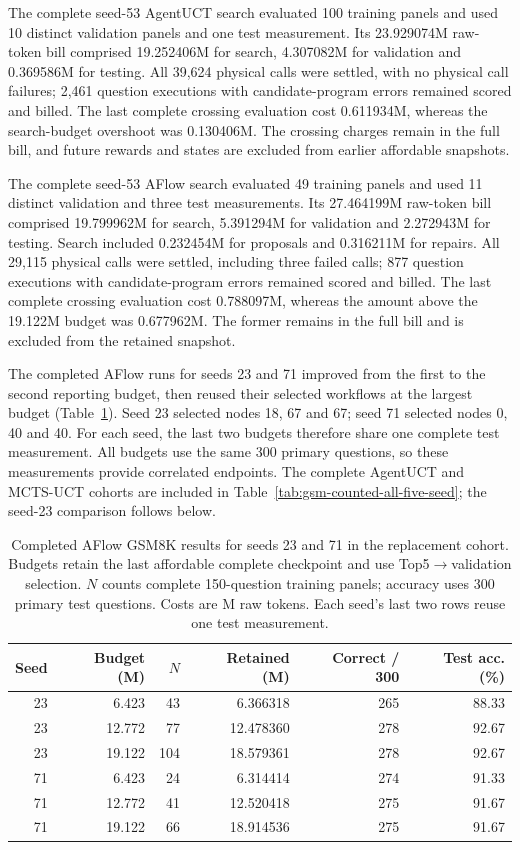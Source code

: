 The complete seed-53 AgentUCT search evaluated 100 training panels and used
10 distinct validation panels and one test measurement. Its 23.929074M
raw-token bill comprised 19.252406M for search, 4.307082M for validation
and 0.369586M for testing. All 39,624 physical calls were settled, with no
physical call failures; 2,461 question executions with candidate-program
errors remained scored and billed. The last complete crossing evaluation
cost 0.611934M, whereas the search-budget overshoot was 0.130406M.
The crossing charges remain in the full bill, and future rewards and states
are excluded from earlier affordable snapshots.

The complete seed-53 AFlow search evaluated 49 training panels and used
11 distinct validation and three test measurements. Its 27.464199M raw-token
bill comprised 19.799962M for search, 5.391294M for validation and 2.272943M
for testing. Search included 0.232454M for proposals and 0.316211M for
repairs. All 29,115 physical calls were settled, including three failed
calls; 877 question executions with candidate-program errors remained
scored and billed. The last complete crossing evaluation cost 0.788097M,
whereas the amount above the 19.122M budget was 0.677962M. The former
remains in the full bill and is excluded from the retained snapshot.

The completed AFlow runs for seeds 23 and 71 improved from the first
to the second reporting budget, then reused their selected workflows at
the largest budget (Table~\ref{tab:gsm-counted-aflow-seeds23-71}).
Seed 23 selected nodes 18, 67 and 67; seed 71 selected nodes 0, 40 and 40.
For each seed, the last two budgets therefore share one complete test
measurement. All budgets use the same 300 primary questions, so these
measurements provide correlated endpoints. The complete AgentUCT and MCTS-UCT cohorts are included in
Table~\ref{tab:gsm-counted-all-five-seed}; the seed-23 comparison follows below.

\begin{table}[t]
\centering\small
\caption{Completed AFlow GSM8K results for seeds 23 and 71 in the
replacement cohort. Budgets retain the last affordable complete checkpoint
and use Top5$\to$validation selection. $N$ counts complete 150-question
training panels; accuracy uses 300 primary test questions. Costs are M raw
tokens. Each seed's last two rows reuse one test measurement.}
\label{tab:gsm-counted-aflow-seeds23-71}
\setlength{\tabcolsep}{4pt}
\begin{tabular}{@{}rrrrrr@{}}
\toprule
Seed & Budget (M) & $N$ & Retained (M) & Correct / 300 & Test acc. (\%)\\
\midrule
23 & 6.423 & 43 & 6.366318 & 265 & 88.33\\
23 & 12.772 & 77 & 12.478360 & 278 & 92.67\\
23 & 19.122 & 104 & 18.579361 & 278 & 92.67\\
71 & 6.423 & 24 & 6.314414 & 274 & 91.33\\
71 & 12.772 & 41 & 12.520418 & 275 & 91.67\\
71 & 19.122 & 66 & 18.914536 & 275 & 91.67\\
\bottomrule
\end{tabular}
\end{table}

